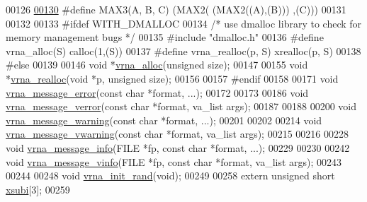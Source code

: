\begin{DoxyCode}
00126 
\hyperlink{group__utils_ga8d577123d2e66d2b7d0bf9af6e172b93}{00130} \textcolor{preprocessor}{#define MAX3(A, B, C)   (MAX2(  (MAX2((A),(B))) ,(C)))}
00131 
00132 
00133 \textcolor{preprocessor}{#ifdef WITH\_DMALLOC}
00134 \textcolor{comment}{/* use dmalloc library to check for memory management bugs */}
00135 \textcolor{preprocessor}{#include "dmalloc.h"}
00136 \textcolor{preprocessor}{#define vrna\_alloc(S)       calloc(1,(S))}
00137 \textcolor{preprocessor}{#define vrna\_realloc(p, S)  xrealloc(p, S)}
00138 \textcolor{preprocessor}{#else}
00139 
00146 \textcolor{keywordtype}{void}  *\hyperlink{group__utils_gaf37a0979367c977edfb9da6614eebe99}{vrna\_alloc}(\textcolor{keywordtype}{unsigned} size);
00147 
00155 \textcolor{keywordtype}{void}  *\hyperlink{group__utils_ga27f4719a66c6f90d1cca3d1e6e696c6a}{vrna\_realloc}(\textcolor{keywordtype}{void} *p, \textcolor{keywordtype}{unsigned} size);
00156 
00157 \textcolor{preprocessor}{#endif}
00158 
00171 \textcolor{keywordtype}{void} \hyperlink{group__utils_ga36b35be01d7f36cf7f59c245eee628d1}{vrna\_message\_error}(\textcolor{keyword}{const} \textcolor{keywordtype}{char} *format, ...);
00172 
00173 
00186 \textcolor{keywordtype}{void} \hyperlink{group__utils_gabc1a08dea0d84b5c33701732172a8b18}{vrna\_message\_verror}(\textcolor{keyword}{const} \textcolor{keywordtype}{char} *format, va\_list args);
00187 
00188 
00200 \textcolor{keywordtype}{void} \hyperlink{group__utils_ga6e07ed24add60693ba886d54d0a46635}{vrna\_message\_warning}(\textcolor{keyword}{const} \textcolor{keywordtype}{char} *format, ...);
00201 
00202 
00214 \textcolor{keywordtype}{void} \hyperlink{group__utils_ga377aa8ec8a49d343063adb22e6311f26}{vrna\_message\_vwarning}(\textcolor{keyword}{const} \textcolor{keywordtype}{char} *format, va\_list args);
00215 
00216 
00228 \textcolor{keywordtype}{void} \hyperlink{group__utils_ga039bae6153a6415b054dbe6045f83d03}{vrna\_message\_info}(FILE *fp, \textcolor{keyword}{const} \textcolor{keywordtype}{char} *format, ...);
00229 
00230 
00242 \textcolor{keywordtype}{void} \hyperlink{group__utils_gad8b8139bd04fbfb51e398e9fcd6908dc}{vrna\_message\_vinfo}(FILE *fp, \textcolor{keyword}{const} \textcolor{keywordtype}{char} *format, va\_list args);
00243 
00244 
00248 \textcolor{keywordtype}{void} \hyperlink{group__utils_ga0ad1f40ea316e5c5918695c35613027a}{vrna\_init\_rand}(\textcolor{keywordtype}{void});
00249 
00258 \textcolor{keyword}{extern} \textcolor{keywordtype}{unsigned} \textcolor{keywordtype}{short} \hyperlink{group__utils_gaf9a866c8417afda7368bbac939ab3c47}{xsubi}[3];
00259 

\end{DoxyCode}

